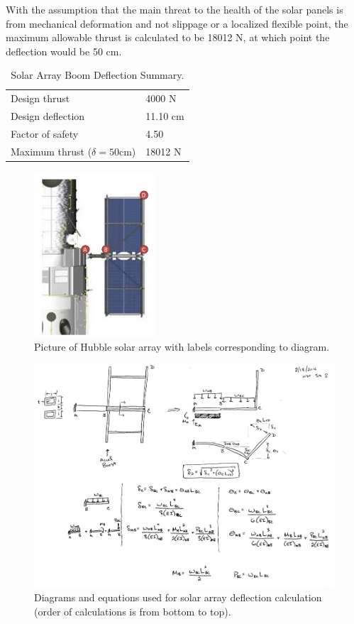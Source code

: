 \documentclass[paper=letter, fontsize=11pt]{scrartcl} %
\numberwithin{equation}{section} %
\numberwithin{figure}{section} %
\numberwithin{table}{section} %
\begin{document}
With the assumption that the main threat to the health of the solar panels is from mechanical deformation and not slippage or a localized flexible point, the maximum allowable thrust is calculated to be 18012 N, at which point the deflection would be 50 cm.

\begin{table}[H]
\centering
\begin{tabular}{l l}
\toprule
Design thrust & 4000 N \\
Design deflection & 11.10 cm \\
Factor of safety & 4.50 \\
Maximum thrust ($\delta=50$cm) & 18012 N \\
\bottomrule
\end{tabular}
\caption{Solar Array Boom Deflection Summary.}
\label{table:solar_deflection}
\end{table}

\begin{figure}[H]
    \begin{center}
    \includegraphics[width=0.4\textwidth]{Pics/12.png}
    \caption{Picture of Hubble solar array with labels corresponding to diagram.}
    \label{fig:p12}
    \end{center}
\end{figure}

\begin{figure}[H]
    \begin{center}
    \includegraphics[width=.8\textwidth]{Pics/boomdefl.png}
    \caption{Diagrams and equations used for solar array deflection calculation (order of calculations is from bottom to top).}
    \label{fig:p13}
    \end{center}
\end{figure}
\end{document}
